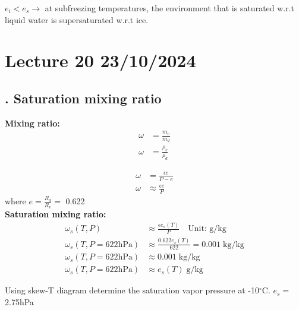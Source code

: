 \documentclass[fleqn,10pt]{SelfArx} %
\begin{document}
$e_i < e_s \rightarrow$ at subfreezing temperatures, the environment that is saturated w.r.t liquid water is supersaturated w.r.t ice.

\clearpage

\section{Lecture 20 23/10/2024}
\subsection{. Saturation mixing ratio}

\textbf{Mixing ratio:}
\begin{align}
    \omega &= \frac{m_v}{m_d} \\
    \omega &= \frac{\rho_v}{\rho_d}
\end{align}

\begin{align}
    \omega &= \frac{\epsilon e}{P - e} \\
    \omega &\approx \frac{\epsilon e}{P}
\end{align}
where $e=\frac{R_d}{R_v}=$ 0.622 \\
\newline
\textbf{Saturation mixing ratio:}
\begin{align}
    \omega_s(T,P) &\approx \frac{\epsilon e_s(T)}{P} \quad \text{Unit: g/kg} \\
    \omega_s(T,P=622\text{hPa}) &\approx \frac{0.622 e_s(T)}{622} = 0.001 \; \text{kg/kg} \\
    \omega_s(T,P=622\text{hPa}) &\approx 0.001 \; \text{kg/kg} \\
    \omega_s(T,P=622\text{hPa}) &\approx e_s(T) \; \text{g/kg} 
\end{align}

\begin{question}[\label:20.1]{Using skew-T diagram determine the saturation vapor pressure at -10$^\circ$C.}
    \Rightarrow $e_s=$2.75hPa
\end{question}
\begin{figure}[!ht]
    \centering
\end{figure}
\end{document}
